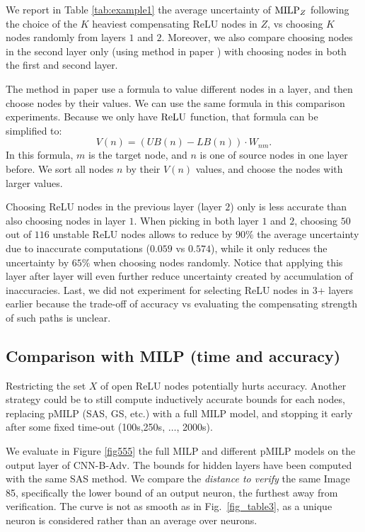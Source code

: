 {\color{red} We report in Table \ref{tab:example1} the average uncertainty of ${\textrm{MILP}}_Z$ following the choice of the $K$ heaviest compensating ReLU nodes in $Z$, vs choosing $K$ nodes randomly from layers $1$ and $2$. 
	Moreover, we also compare choosing nodes in the second layer only (using method in paper \cite{ DivideAndSlide}) with choosing nodes in both the first and second layer.
	
	
		The method in paper \cite{ DivideAndSlide} use a formula to value different nodes in a layer, and then choose nodes by their values. We can use the same formula in this comparison experiments. Because we only have $\mathrm{ReLU}$ function, that formula can be simplified to: $$V(n) = (UB(n)-LB(n))\cdot W_{nm}.$$ In this formula, $m$ is the target node, and $n$ is one of source nodes in one layer before. We sort all nodes $n$ by their $V(n)$ values, and choose the nodes with larger values. 
	
	
	
	Choosing ReLU nodes in the previous layer (layer $2$) only is less accurate than 
	also choosing nodes in layer $1$. 	When picking in both layer $1$ and $2$, choosing $50$ out of $116$ unstable ReLU nodes allows to reduce by $90\%$ the average uncertainty due to inaccurate computations ($0.059$ vs $0.574$), while it only reduces the uncertainty by $65\%$ when choosing nodes randomly. Notice that applying this layer after layer will even further reduce uncertainty created by accumulation of inaccuracies. 
	Last, we did not experiment for selecting ReLU nodes in 3+ layers earlier because the trade-off of accuracy vs evaluating the compensating strength of such paths is unclear. 
	
}
\fi







\subsection{Comparison with MILP (time and accuracy)}

Restricting the set $X$ of open ReLU nodes potentially hurts accuracy. 
Another strategy could be to still compute inductively accurate bounds for each nodes,
replacing pMILP ({\sf SAS, GS}, etc.) with a full MILP model, and stopping it early after some fixed time-out (100s,250s, $\ldots$, 2000s).

We evaluate in Figure \ref{fig555} the full MILP and different pMILP models on the output layer of CNN-B-Adv. The bounds for hidden layers have been computed with the same {\sf SAS} method.
We compare the {\em distance to verify} the same Image 85, specifically the lower bound of an output neuron, the furthest away from verification.
The curve is not as smooth as in Fig.~\ref{fig_table3}, as a unique neuron is considered rather than an average over neurons.

